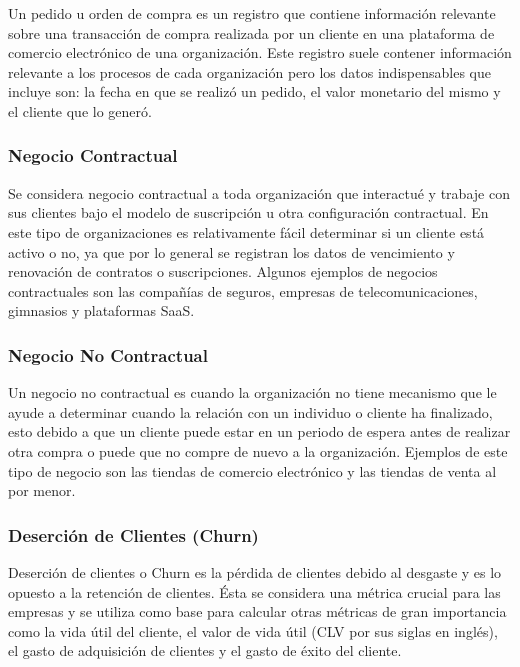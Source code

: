 Un pedido u orden de compra es un registro que contiene información relevante sobre una transacción de compra realizada por un cliente en una plataforma de comercio electrónico de una organización. Este registro suele contener información relevante a los procesos de cada organización pero los datos indispensables que incluye son: la fecha en que se realizó un pedido, el valor monetario del mismo y el cliente que lo generó.

\subsubsection{Negocio Contractual}

Se considera negocio contractual a toda organización que interactué y trabaje con sus clientes bajo el modelo de suscripción u otra configuración contractual. En este tipo de organizaciones es relativamente fácil determinar si un cliente está activo o no, ya que por lo general se registran los datos de vencimiento y renovación de contratos o suscripciones. Algunos ejemplos de negocios contractuales son las compañías de seguros, empresas de telecomunicaciones, gimnasios y plataformas SaaS.

\subsubsection{Negocio No Contractual}

Un negocio no contractual es cuando la organización no tiene mecanismo que le ayude a determinar cuando la relación con un individuo o cliente ha finalizado, esto debido a que un cliente puede estar en un periodo de espera antes de realizar otra compra o puede que no compre de nuevo a la organización. Ejemplos de este tipo de negocio son las tiendas de comercio electrónico y las tiendas de venta al por menor.

\subsubsection{Deserción de Clientes (Churn)}

Deserción de clientes o Churn es la pérdida de clientes debido al desgaste y es lo opuesto a la retención de clientes. Ésta se considera una métrica crucial para las empresas y se utiliza como base para calcular otras métricas de gran importancia como la vida útil del cliente, el valor de vida útil (CLV por sus siglas en inglés), el gasto de adquisición de clientes y el gasto de éxito del cliente.

